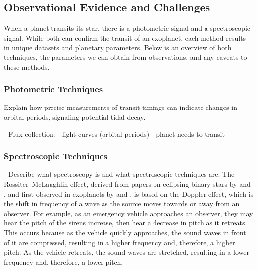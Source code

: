 \documentclass[oneside,12pt]{amsart}
\numberwithin{page}{section}
\begin{document}
\clearpage


\subsection{Observational Evidence and Challenges}

When a planet transits its star, there is a photometric signal and a spectroscopic signal. While both can confirm the transit of an exoplanet, each method results in unique datasets and planetary parameters. Below is an overview of both techniques, the parameters we can obtain from observations, and any caveats to these methods.

\subsubsection{Photometric Techniques}
Explain how precise measurements of transit timings can indicate changes in orbital periods, signaling potential tidal decay.

- Flux collection: 
    - light curves (orbital periods)
    - planet needs to transit

\subsubsection{Spectroscopic Techniques}
- Describe what spectroscopy is and what spectroscopic techniques are.
The Rossiter–McLaughlin effect, derived from papers on eclipsing binary stars by \citep{rossiter1924detection} and \citep{mclaughlin1924some}, and first observed in exoplanets by \citep{queloz2000detection} and \citep{bundy2000search}, is based on the Doppler effect, which is the shift in frequency of a wave as the source moves towards or away from an observer. For example, as an emergency vehicle approaches an observer, they may hear the pitch of the sirens increase, then hear a decrease in pitch as it retreats. This occurs because as the vehicle quickly approaches, the sound waves in front of it are compressed, resulting in a higher frequency and, therefore, a higher pitch. As the vehicle retreats, the sound waves are stretched, resulting in a lower frequency and, therefore, a lower pitch. 
\end{document}
